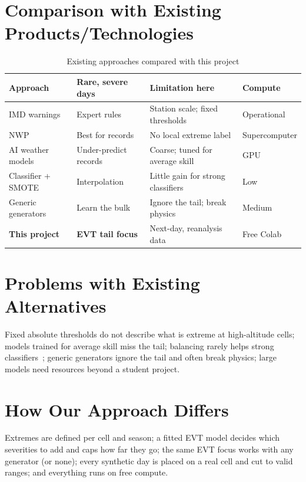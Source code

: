 \documentclass[12pt,a4paper]{report}
\begin{document}
\section{Comparison with Existing Products/Technologies}
\begin{table}[H]
\centering
\caption{Existing approaches compared with this project}
\label{tab:market}
\footnotesize
\begin{tabularx}{\textwidth}{|p{2.6cm}|X|X|p{2.0cm}|}
\hline
\textbf{Approach} & \textbf{Rare, severe days} & \textbf{Limitation here} & \textbf{Compute}\\ \hline
IMD warnings & Expert rules & Station scale; fixed thresholds & Operational \\ \hline
NWP & Best for records & No local extreme label & Supercomputer \\ \hline
AI weather models & Under-predict records & Coarse; tuned for average skill & GPU \\ \hline
Classifier + SMOTE & Interpolation & Little gain for strong classifiers~\cite{elor2022smote} & Low \\ \hline
Generic generators & Learn the bulk & Ignore the tail; break physics & Medium \\ \hline
\textbf{This project} & \textbf{EVT tail focus} & Next-day, reanalysis data & Free Colab \\ \hline
\end{tabularx}
\end{table}

\section{Problems with Existing Alternatives}
Fixed absolute thresholds do not describe what is extreme at high-altitude cells; models trained for average skill
miss the tail; balancing rarely helps strong classifiers~\cite{elor2022smote}; generic generators ignore the tail and
often break physics; large models need resources beyond a student project.

\section{How Our Approach Differs}
Extremes are defined per cell and season; a fitted EVT model decides which severities to add and caps how far they go;
the same EVT focus works with any generator (or none); every synthetic day is placed on a real cell and cut to valid ranges; and everything runs on free
compute.
\end{document}
